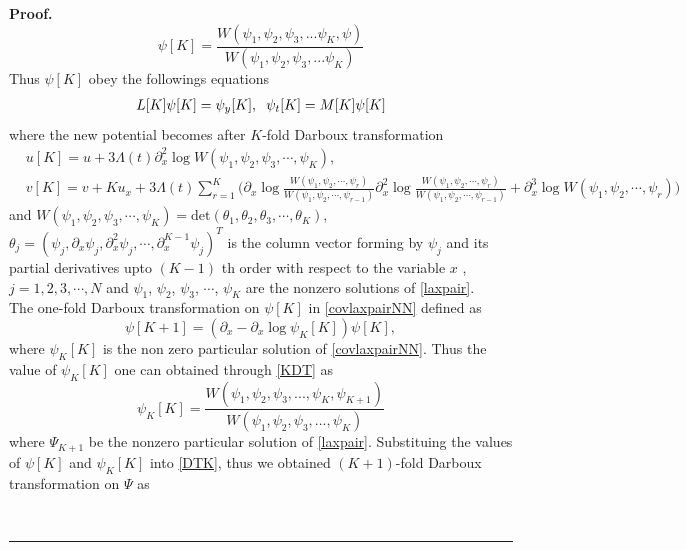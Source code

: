 \documentclass{article}%
\newenvironment{proof}[1][Proof]{\noindent\textbf{#1.} }{\ \rule{0.5em}{0.5em}}
\begin{document}
\begin{proof}
\begin{equation}
\psi[K]=\frac{W(\psi_{1},\psi_{2},\psi_{3},...\psi_{K},\psi)}{W(\psi_{1},\psi_{2},\psi_{3},...\psi_{K})} \label{KDT}
\end{equation}
Thus $\psi[K]$ obey the followings equations
\begin{equation}
\begin{split}
 L[K]\psi[K]=\psi_y[K],\hspace{2mm}\psi_t[K]=M[K]\psi[K] 
 \label{covlaxpairNN}
\end{split}
\end{equation}
where the new potential becomes after $K$-fold Darboux transformation
\begin{equation}
 \begin{split}
 &u[K]=u+3\Lambda(t)\partial^{2}_{x}\log W(\psi_{1},\psi_{2},\psi_{3},\cdots,\psi_{K}),\\
 &v[K]=v+Ku_x+3\Lambda(t)\sum_{r=1}^{K}\bigg(\partial_x\log \frac{W(\psi_1,\psi_2,\cdots,\psi_r)}{W(\psi_1,\psi_2,\cdots,\psi_{r-1})}\partial^{2}_x\log\frac{W(\psi_1,\psi_2,\cdots,\psi_r)}{W(\psi_1,\psi_2,\cdots,\psi_{r-1})}+\partial^{3}_x\log W(\psi_1,\psi_2,\cdots,\psi_r)\bigg)
 \end{split}                              \label{newsolNN}
\end{equation}
and $W(\psi_{1},\psi_{2},\psi_{3},\cdots,\psi_{K})=\text{det}(\theta_1, \theta_2, \theta_3,\cdots, \theta_K)$, $\theta_j=(\psi_j,\partial_{x}\psi_j,\partial^2_{x}\psi_j,\cdots,\partial^{K-1}_{x}\psi_j)^T$ is the column vector forming by $\psi_j$ and its partial derivatives upto $(K-1)$ th order with respect to the variable $x$ , $j=1,2,3,\cdots, N$ and $\psi_{1}$, $\psi_{2}$, $\psi_{3}$, $\cdots$, $\psi_{K}$ are the nonzero solutions of \eqref{laxpair}.\\
The one-fold Darboux transformation on $\psi[K]$ in \eqref{covlaxpairNN} defined as
\begin{equation}
\psi[K+1]=(\partial_x-\partial_x\log\psi_K[K])\psi[K],\label{DTK}
\end{equation}
where $\psi_K[K]$ is the non zero particular solution of \eqref{covlaxpairNN}. Thus the value of $\psi_K[K]$ one can obtained through \eqref{KDT} as
\begin{equation}
\psi_K[K]=\frac{W(\psi_{1},\psi_{2},\psi_{3},...,\psi_{K},\psi_{K+1})}{W(\psi_{1},\psi_{2},\psi_{3},...,\psi_{K})}
\end{equation}
where $\Psi_{K+1}$ be the nonzero particular solution of \eqref{laxpair}. Substituing the values of  $\psi[K]$ and $\psi_K[K]$  into \eqref{DTK}, thus we obtained $(K+1)$-fold Darboux transformation on $\Psi$ as 

\end{proof}
\end{document}
